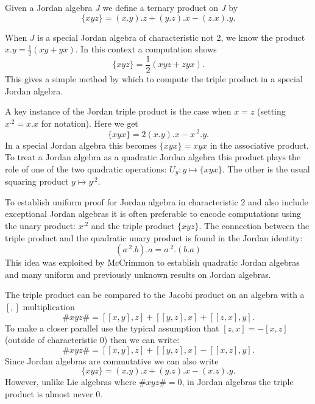 \documentclass[12pt]{article}
\begin{document}
Given a Jordan algebra $J$ we define a ternary product on $J$ by
\[\{xyz\}=(x.y).z+(y.z).x - (z.x).y.\]

When $J$ is a special Jordan algebra of characteristic not 2, we know the product $x.y=\frac{1}{2}(xy+yx)$.  In this context a computation shows
\[\{xyz\}=\frac{1}{2}(xyz+zyx).\]
This gives a simple method by which to compute the triple product in a special
Jordan algebra.

A key instance of the Jordan triple product is the case when $x=z$ (setting
$x^{.2}=x.x$ for notation).  Here we get
\[\{xyx\}=2 (x.y).x-x^{.2}.y.\]
In a special Jordan algebra this becomes $\{xyx\}=xyx$ in the associative product.  To treat a Jordan algebra as a quadratic Jordan algebra this product plays the role of one of the two quadratic operations: $U_y:y\mapsto \{xyx\}$.  
The other is the usual squaring product $y\mapsto y^{.2}$.

To establish uniform proof for Jordan algebra in characteristic 2 and also include exceptional Jordan algebras it is often preferable to encode computations using the unary product: $x^{.2}$ and the triple product
$\{xyz\}$.  The connection between the triple product and the quadratic unary product is found in the Jordan identity:
\[(a^{.2}.b).a=a^{.2}.(b.a)\]
This idea was exploited by McCrimmon to establish quadratic Jordan algebras and many uniform and previously unknown results on Jordan algebras.



The triple product can be compared to the Jacobi product on an algebra with a $[,]$ multiplication
\[\# xyz\#=[[x,y],z]+[[y,z],x]+[[z,x],y].\]
To make a closer parallel use the typical assumption that $[z,x]=-[x,z]$ (outside of characteristic 0) then we can write:
\[\# xyz\#=[[x,y],z]+[[y,z],x]-[[x,z],y].\]
Since Jordan algebras are commutative we can also write
\[\{xyz\}=(x.y).z+(y.z).x - (x.z).y.\]
However, unlike Lie algebras where $\# xyz\#=0$, in Jordan algebras the triple product is almost never 0.
\end{document}
